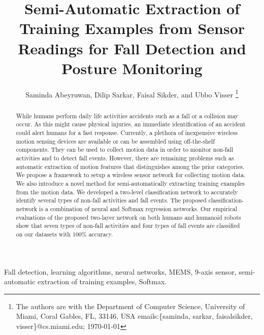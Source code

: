 \documentclass[]{IEEEtran}
\title{Semi-Automatic Extraction of Training Examples from Sensor Readings for Fall Detection and Posture Monitoring}
\author{{Saminda Abeyruwan}, {Dilip Sarkar}, {Faisal Sikder}, and {Ubbo Visser}
\thanks{The authors are with the Department of Computer Science, University of Miami,
  Coral Gables, FL, 33146, USA
{ emails:\{saminda, sarkar, faisalsikder, visser\}@cs.miami.edu};
\today} }
\begin{document}
\maketitle
\IEEEpeerreviewmaketitle

\begin{abstract}
While humans perform daily life activities accidents such as a fall or a collision may occur. As
this might cause physical injuries, an immediate identification of an accident could alert humans for a fast
response. Currently, a plethora of inexpensive wireless motion sensing devices are available or can be assembled using off-the-shelf components. They can be used to collect motion data in 
order to monitor non-fall activities and to detect fall events. However, there are remaining problems such as
automatic extraction of motion features that distinguishes among the prior categories. We propose
 a framework to setup a wireless sensor network for collecting motion data. We also 
introduce a novel method for semi-automatically extracting training examples from the motion data.
We developed a two-level classification network to accurately identify several types of
non-fall activities and fall events. The proposed classification-network is a combination of neural
and Softmax regression networks.  Our empirical evaluations of the proposed two-layer network 
on both humans and humanoid robots show
that seven types of non-fall activities and four types of fall events are classified on our datasets
with 100\% accuracy.  \end{abstract}

\begin{IEEEkeywords} Fall detection, learning algorithms, neural networks, {MEMS}, 9-axis sensor,
semi-automatic extraction of training examples, Softmax.  \end{IEEEkeywords}

\end{document}
